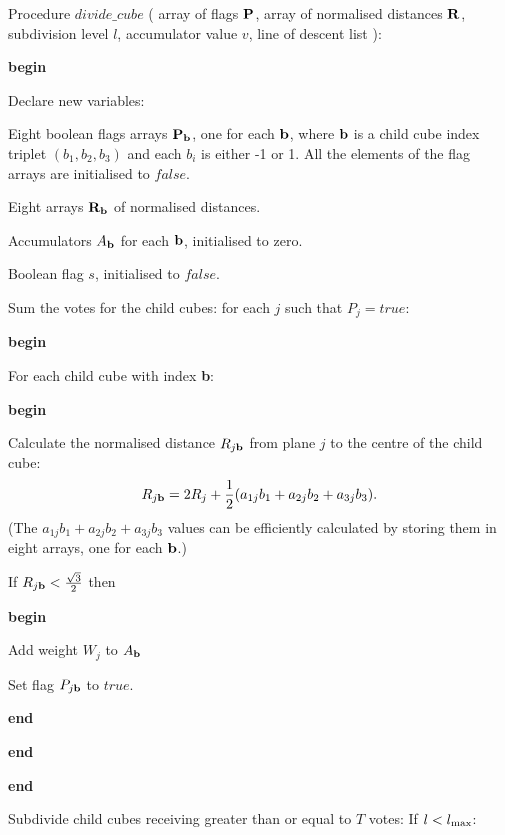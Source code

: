   Procedure $divide\_cube$ ( array of flags ${\bf P}$, array of normalised
  distances ${\bf R}$, subdivision level $l$,
  accumulator value $v$, line of descent list ):

  {\bf begin}
  \begin{indent_para}
     Declare new variables:
     \begin{indent_para}
      Eight boolean flags arrays ${\bf P}_{\bf b}$, one for
      each ${\bf b}$, where ${\bf b}$
      is a child cube index triplet $(b_1 , b_2 , b_3 )$ and each $b_i$ is
      either -1 or 1. All the elements of the flag arrays are initialised
      to $false$.

      Eight arrays ${\bf R}_{\bf b}$ of normalised distances.

      Accumulators $A_{\bf b}$ for each ${\bf b}$, initialised to zero.

      Boolean flag $s$, initialised to $false$.
     \end{indent_para}
     Sum the votes for the child cubes: for each $j$ such that $P_j = true$:

     {\bf begin}
     \begin{indent_para}
      For each child cube with index {\bf b}:

      {\bf begin}
      \begin{indent_para}
       Calculate the normalised distance $R_{j {\bf b}}$ from plane $j$
       to the centre of the child cube:
       \begin{displaymath}
	R_{j {\bf b}} = 2R_j + \frac{1}{2}
	(a_{1j} b_1 + a_{2j} b_2 + a_{3j} b_3).
       \end{displaymath}
       (The $a_{1j} b_1 + a_{2j} b_2 + a_{3j} b_3$ values can be
	efficiently calculated by storing them in eight arrays, one for each
	${\bf b}$.)

       If $R_{j {\bf b}} < \frac{\sqrt{3}}{2}$ then

       {\bf begin}
       \begin{indent_para}
	Add weight $W_j$ to $A_{\bf b}$

	Set flag $P_{j {\bf b}}$ to $true$.
       \end{indent_para}
       {\bf end}
       \end{indent_para}
      {\bf end}
     \end{indent_para}
     {\bf end}

     Subdivide child cubes receiving greater than or equal to $T$ votes:
     If $l < l_{\rm max}$:


\end{indent_para}

